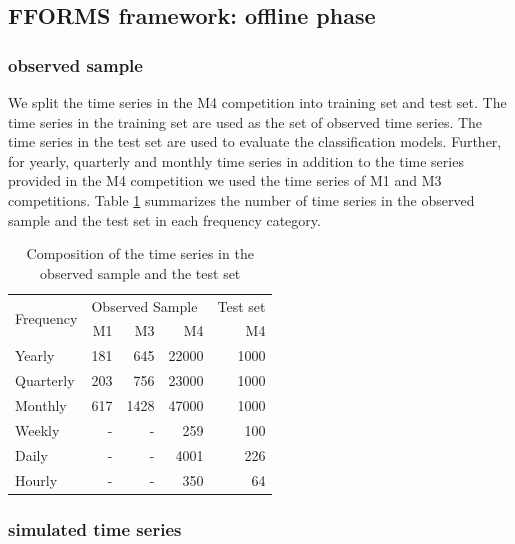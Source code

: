 \documentclass[11pt,a4paper,]{article}
\theoremstyle{definition}
\theoremstyle{definition}
\theoremstyle{definition}
\theoremstyle{remark}
\begin{document}
\subsection{FFORMS framework: offline
phase}\label{fforms-framework-offline-phase}

\subsubsection{observed sample}\label{observed-sample}

We split the time series in the M4 competition into training set and
test set. The time series in the training set are used as the set of
observed time series. The time series in the test set are used to
evaluate the classification models. Further, for yearly, quarterly and
monthly time series in addition to the time series provided in the M4
competition we used the time series of M1 and M3 competitions. Table
\ref{observedsample} summarizes the number of time series in the
observed sample and the test set in each frequency category.

\begin{table}[!h]
\centering
\caption{Composition of the time series in the observed sample and the test set}
\label{observedsample}
\begin{tabular}{l|rrr|r}
\multirow{2}{*}{Frequency} & \multicolumn{3}{l|}{Observed Sample} &  Test set \\ 
                  &   M1    &    M3   &    M4  &  M4 \\ \hline
  Yearly          &   181    &   645    &   22000   & 1000 \\
  Quarterly       &   203    &    756   &   23000   &  1000\\
  Monthly         &   617    &    1428   &  47000    &  1000\\
  Weekly          &   -    &   -    &   259   & 100 \\
  Daily           &   -    &   -    &   4001   & 226 \\
  Hourly          &   -    &    -   &  350    & 64\\ \hline
\end{tabular}
\end{table}

\subsubsection{simulated time series}\label{simulated-time-series}
\end{document}
